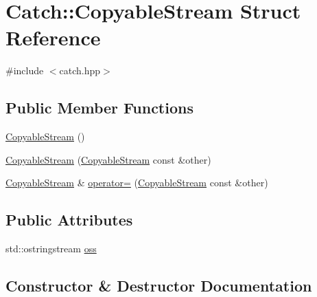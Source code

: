 \hypertarget{struct_catch_1_1_copyable_stream}{}\section{Catch\+:\+:Copyable\+Stream Struct Reference}
\label{struct_catch_1_1_copyable_stream}


{\ttfamily \#include $<$catch.\+hpp$>$}

\subsection*{Public Member Functions}
\begin{DoxyCompactItemize}
\item 
\mbox{\hyperlink{struct_catch_1_1_copyable_stream_a5a61d0da675ae00cd46efaef4c445cdd}{Copyable\+Stream}} ()
\item 
\mbox{\hyperlink{struct_catch_1_1_copyable_stream_a0e72dc16240653f52c17106f4bf34da8}{Copyable\+Stream}} (\mbox{\hyperlink{struct_catch_1_1_copyable_stream}{Copyable\+Stream}} const \&other)
\item 
\mbox{\hyperlink{struct_catch_1_1_copyable_stream}{Copyable\+Stream}} \& \mbox{\hyperlink{struct_catch_1_1_copyable_stream_a1760fa29b38011c5845171260bec0966}{operator=}} (\mbox{\hyperlink{struct_catch_1_1_copyable_stream}{Copyable\+Stream}} const \&other)
\end{DoxyCompactItemize}
\subsection*{Public Attributes}
\begin{DoxyCompactItemize}
\item 
std\+::ostringstream \mbox{\hyperlink{struct_catch_1_1_copyable_stream_ae123fb4d673e7d7a13a3c5f6bc5d426c}{oss}}
\end{DoxyCompactItemize}


\subsection{Constructor \& Destructor Documentation}
\mbox{\label{struct_catch_1_1_copyable_stream_a5a61d0da675ae00cd46efaef4c445cdd}} 

